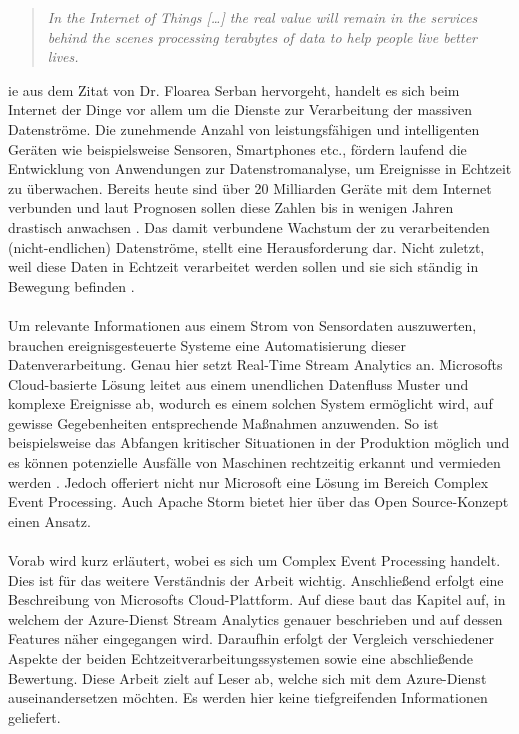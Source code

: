
\begin{quote} \textit{\glqq In the Internet of Things […] the real value will remain in the services behind the scenes processing terabytes of data to help people live better lives. \grqq~}\cite{Floarea.2014}\\ \end{quote} 

ie aus dem Zitat von Dr. Floarea Serban hervorgeht, handelt es sich beim Internet der Dinge vor allem um die Dienste zur Verarbeitung der massiven Datenströme. Die zunehmende Anzahl von leistungsfähigen und intelligenten Geräten wie beispielsweise Sensoren, Smartphones etc., fördern laufend die Entwicklung von Anwendungen zur Datenstromanalyse, um Ereignisse in Echtzeit zu überwachen. Bereits heute sind über 20 Milliarden Geräte mit dem Internet verbunden und laut Prognosen sollen diese Zahlen bis in wenigen Jahren drastisch anwachsen \cite{Statista.2017}. Das damit verbundene Wachstum der zu verarbeitenden (nicht-endlichen) Datenströme, stellt eine Herausforderung dar. Nicht zuletzt, weil diese Daten in Echtzeit verarbeitet werden sollen und sie sich ständig in Bewegung befinden \cite{Prosise.}.\\ \\  
Um relevante Informationen aus einem Strom von Sensordaten auszuwerten, brauchen ereignisgesteuerte Systeme eine Automatisierung dieser Datenverarbeitung. Genau hier setzt Real-Time Stream Analytics an. Microsofts Cloud-basierte Lösung leitet aus einem unendlichen Datenfluss Muster und komplexe Ereignisse ab, wodurch es einem solchen System ermöglicht wird, auf gewisse Gegebenheiten entsprechende Maßnahmen anzuwenden. So ist beispielsweise das Abfangen kritischer Situationen in der Produktion möglich und es können potenzielle Ausfälle von Maschinen rechtzeitig erkannt und vermieden werden \cite{rcrwireless.2016}. Jedoch offeriert nicht nur Microsoft eine Lösung im Bereich Complex Event Processing. Auch Apache Storm bietet hier über das Open Source-Konzept einen Ansatz.\\ \\
Vorab wird kurz erläutert, wobei es sich um Complex Event Processing handelt. Dies ist für das weitere Verständnis der Arbeit wichtig. Anschließend erfolgt eine Beschreibung von Microsofts Cloud-Plattform. Auf diese baut das Kapitel auf, in welchem der Azure-Dienst Stream Analytics genauer beschrieben und auf dessen Features näher eingegangen wird. Daraufhin erfolgt der Vergleich verschiedener Aspekte der beiden Echtzeitverarbeitungssystemen sowie eine abschließende Bewertung. Diese Arbeit zielt auf Leser ab, welche sich mit dem Azure-Dienst auseinandersetzen möchten. Es werden hier keine tiefgreifenden Informationen geliefert.\\ \\
